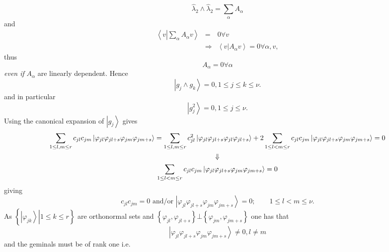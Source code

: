 \documentclass[12pt]{article}
\begin{document}
\begin{equation}
\hat{\lambda}_{2}\wedge \hat{\lambda}_{2}=\sum_{\alpha }A_{\alpha }
\end{equation}%
and 
\begin{eqnarray}
\left\langle v\left\vert \sum_{\alpha }A_{\alpha }\right. v\right\rangle 
&=&0\forall v \\
&\Rightarrow &\left\langle v\left\vert A_{\alpha }\right. v\right\rangle
=0\forall \alpha ,v,
\end{eqnarray}%
thus 
\begin{equation}
A_{\alpha }=0\forall \alpha 
\end{equation}%
\emph{even if }$A_{\alpha }$ are linearly dependent. Hence 
\begin{equation}
\left\vert g_{j}\wedge g_{k}\right\rangle =0,1\leq j\leq k\leq \nu .
\end{equation}%
and in particular 
\begin{equation}
\left\vert g_{j}^{2}\right\rangle =0,1\leq j\leq \nu .
\end{equation}%
Using the canonical expansion of $\left\vert g_{j}\right\rangle $ gives 
\begin{gather}
\sum_{1\leq l,m\leq r}c_{jl}c_{jm}\left\vert \varphi _{jl}\varphi
_{jl+s}\varphi _{jm}\varphi _{jm+s}\right\rangle =\sum_{1\leq l,m\leq
r}c_{jl}^{2}\left\vert \varphi _{jl}\varphi _{jl+s}\varphi _{jl}\varphi
_{jl+s}\right\rangle +2\sum_{1\leq l<m\leq r}c_{jl}c_{jm}\left\vert \varphi
_{jl}\varphi _{jl+s}\varphi _{jm}\varphi _{jm+s}\right\rangle =0  \notag \\
\Downarrow   \notag \\
\sum_{1\leq l<m\leq r}c_{jl}c_{jm}\left\vert \varphi _{jl}\varphi
_{jl+s}\varphi _{jm}\varphi _{jm+s}\right\rangle =0
\end{gather}%
giving 
\begin{equation}
c_{jl}c_{jm}=0\text{ and/or }\left\vert \varphi _{jl}\varphi _{jl+s}\varphi
_{jm}\varphi _{jm+s}\right\rangle =0;\quad \quad 1\leq l<m\leq \nu .
\end{equation}%
As $\left\{ \left. \left\vert \varphi _{jk}\right\rangle \right\vert 1\leq
k\leq r\right\} $ are orthonormal sets and $\left\{ \varphi _{jl},\varphi
_{jl+s}\right\} \bot \left\{ \varphi _{jm},\varphi _{jm+s}\right\} $ one has
that 
\begin{equation}
\left\vert \varphi _{jl}\varphi _{jl+s}\varphi _{jm}\varphi
_{jm+s}\right\rangle \neq 0,l\neq m
\end{equation}%
and the geminals must be of rank one i.e. 
\end{document}
